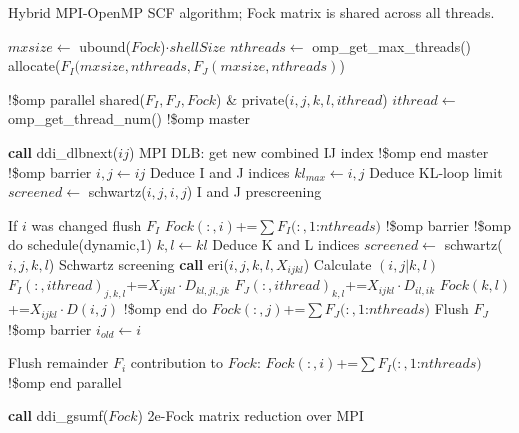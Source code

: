 \begin{algorithm}[t]
\caption{Hybrid MPI-OpenMP SCF algorithm; Fock matrix is shared across all threads.}\label{alg:ompsh}
\begin{algorithmic}[1]

\State $mxsize \gets$ ubound($Fock$)$\cdot shellSize$
\State $nthreads \gets$ omp\_get\_max\_threads()
\State allocate($F_I(mxsize,nthreads, F_J(mxsize,nthreads)$)

\State !\$omp parallel shared($F_I, F_J, Fock$) \&
\Statex[1] private($i,j,k,l,ithread$)
\State $ithread \gets$ omp\_get\_thread\_num()
\Loop
	\State !\$omp master
    
    \State \textbf{call} ddi\_dlbnext($ij$) \Comment MPI DLB: get new combined IJ index
	\State !\$omp end master
	\State !\$omp barrier
    \State $i,j\gets ij$ 			\Comment Deduce I and J indices
    \State ${kl}_{max}\gets i,j$ 	\Comment Deduce KL-loop limit
    \State $screened\gets$ schwartz($i,j,i,j$) \Comment I and J prescreening 
    
    	 \Comment If $i$ was changed flush $F_I$
    		\State $Fock(:,i)$+=$\sum F_I(:,1$:$nthreads)$
            \State !\$omp barrier
   		\EndIf
    	\State !\$omp do schedule(dynamic,1)
    		\State $k,l\gets kl$ \Comment Deduce K and L indices
       		\State $screened\gets$ schwartz($i,j,k,l$) \Comment Schwartz screening
                	\State \textbf{call} eri($i,j,k,l,X_{ijkl}$) \Comment Calculate $(i,j|k,l)$
                	\State $F_I(:,ithread)_{j,k,l}$+=$X_{ijkl}\cdot D_{kl,jl,jk}$ 	\label{alg:ompsh:fi}
                	\State $F_J(:,ithread)_{k,l}$+=$X_{ijkl}\cdot D_{il,ik}$
                     						\label{alg:ompsh:fj}
                	\State $Fock(k,l)$+=$X_{ijkl}\cdot D(i,j)$ 						\label{alg:ompsh:fk}
           		\EndIf
		\EndFor
    	\State !\$omp end do
		\State $Fock(:,j)$+=$\sum F_J(:,1$:$nthreads)$		\Comment Flush $F_J$	\label{alg:ompsh:iflush}
        \State !\$omp barrier
    	\State $i_{old} \gets i$													\label{alg:ompsh:iold}
    \EndIf

\EndLoop

\LeftComment Flush remainder $F_i$ contribution to $Fock$:
\State $Fock(:,i)$+=$\sum F_I(:,1$:$nthreads)$
\State !\$omp end parallel

\State \textbf{call} ddi\_gsumf($Fock$) \Comment 2e-Fock matrix reduction over MPI
\end{algorithmic}
\end{algorithm}

